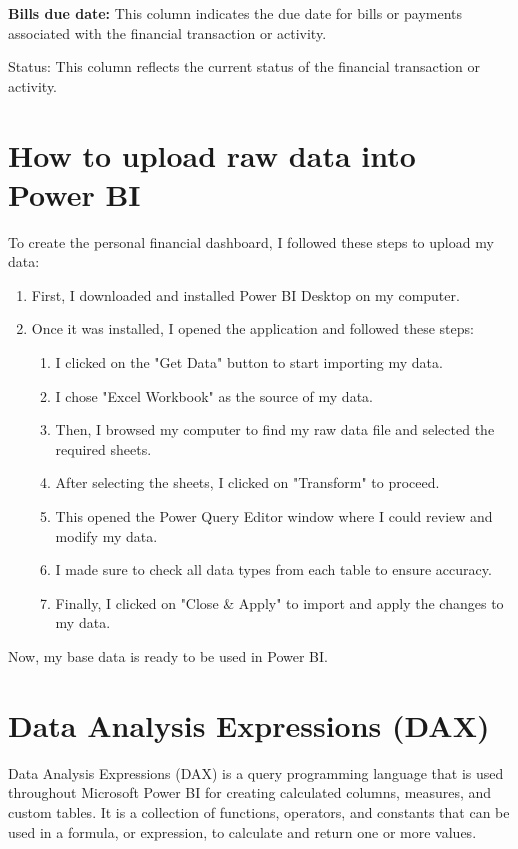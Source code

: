 \textbf{Bills due date: }This column indicates the due date for bills or payments associated with the financial transaction or activity.

Status: This column reflects the current status  of the financial transaction or activity. 

\section {How to upload raw data into Power BI}
To create the personal financial dashboard, I followed these steps to upload my data:

\begin{enumerate}
    \item First, I downloaded and installed Power BI Desktop on my computer.
    \item Once it was installed, I opened the application and followed these steps:
    \begin{enumerate}
        \item I clicked on the "Get Data" button to start importing my data.
        \item I chose "Excel Workbook" as the source of my data.
        \item Then, I browsed my computer to find my raw data file and selected the required sheets.
        \item After selecting the sheets, I clicked on "Transform" to proceed.
        \item This opened the Power Query Editor window where I could review and modify my data.
        \item I made sure to check all data types from each table to ensure accuracy.
        \item Finally, I clicked on "Close \& Apply" to import and apply the changes to my data.
    \end{enumerate}
\end{enumerate}

Now, my base data is ready to be used in Power BI.


\section{Data Analysis Expressions (DAX) }
Data Analysis Expressions (DAX) is a query programming language that is used throughout
Microsoft Power BI for creating calculated columns, measures, and custom tables. It is a
collection of functions, operators, and constants that can be used in a formula, or expression, to
calculate and return one or more values.

